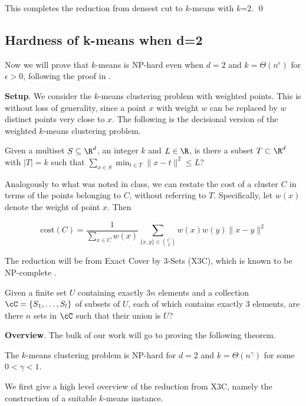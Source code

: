 This completes the reduction from densest cut to $k$-means with $k$=2.
\qed

\subsection{Hardness of k-means when d=2}

Now we will prove that $k$-means is NP-hard even when $d=2$ and $k=\Theta(n^\epsilon)$ for $\epsilon>0$, following the proof in \cite{vattani}.

\textbf{Setup}. We consider the $k$-means clustering problem with weighted points. This is without loss of generality, since a point $x$ with weight $w$ can be replaced by $w$ distinct points very close to $x$. The following is the decisional version of the weighted $k$-means clustering problem.

\begin{definition}
    Given a multiset $S\subseteq \R^d$, an integer $k$ and $L\in\R$, is there a subset $T\subset\R^d$ with $|T|=k$ such that $\sum_{x\in S}\min_{t\in T}\|x-t\|^2\le L$?
\end{definition}

Analogously to what was noted in class, we can restate the cost of a cluster $C$ in terms of the points belonging to $C$, without referring to $T$. Specifically, let $w(x)$ denote the weight of point $x$. Then

$$\text{cost}(C)=\frac{1}{\sum_{x\in C} w(x)}\sum_{\{x,y\}\in\binom{C}{2}}w(x)w(y)\|x-y\|^2$$

The reduction will be from Exact Cover by 3-Sets (X3C), which is known to be NP-complete \cite{garey1979computers}.

\begin{definition}
    Given a finite set $U$ containing exactly $3n$ elements and a collection $\cC=\{S_1,\dots,S_l\}$ of subsets of $U$, each of which contains exactly 3 elements, are there $n$ sets in $\cC$ such that their union is $U$?
\end{definition}

\textbf{Overview}. The bulk of our work will go to proving the following theorem.

\begin{theorem}\label{thm1}
The $k$-means clustering problem is NP-hard for $d=2$ and $k=\Theta(n^\gamma)$ for some $0<\gamma<1$.
\end{theorem}

We first give a high level overview of the reduction from X3C, namely the construction of a suitable $k$-means instance.


